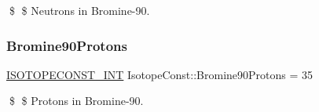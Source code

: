 \$ \$ Neutrons in Bromine-\/90. \mbox{\label{group___isotope_const-_bromine-_br90_ga3cf28fcfebdd74fe5abf4676480f4b25}} 
\subsubsection{\texorpdfstring{Bromine90\+Protons}{Bromine90Protons}}
{\footnotesize\ttfamily \mbox{\hyperlink{group___isotope_const-_macros_ga5f18360b3e99483a35c32d789e62621c}{I\+S\+O\+T\+O\+P\+E\+C\+O\+N\+S\+T\+\_\+\+I\+NT}} Isotope\+Const\+::\+Bromine90\+Protons = 35}

\$ \$ Protons in Bromine-\/90. 